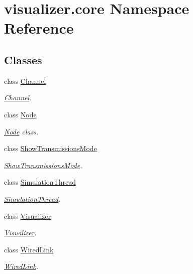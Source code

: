 \hypertarget{namespacevisualizer_1_1core}{}\section{visualizer.\+core Namespace Reference}
\label{namespacevisualizer_1_1core}
\subsection*{Classes}
\begin{DoxyCompactItemize}
\item 
class \hyperlink{classvisualizer_1_1core_1_1Channel}{Channel}
\begin{DoxyCompactList}\small\item\em \hyperlink{classvisualizer_1_1core_1_1Channel}{Channel}. \end{DoxyCompactList}\item 
class \hyperlink{classvisualizer_1_1core_1_1Node}{Node}
\begin{DoxyCompactList}\small\item\em \hyperlink{classvisualizer_1_1core_1_1Node}{Node} class. \end{DoxyCompactList}\item 
class \hyperlink{classvisualizer_1_1core_1_1ShowTransmissionsMode}{Show\+Transmissions\+Mode}
\begin{DoxyCompactList}\small\item\em \hyperlink{classvisualizer_1_1core_1_1ShowTransmissionsMode}{Show\+Transmissions\+Mode}. \end{DoxyCompactList}\item 
class \hyperlink{classvisualizer_1_1core_1_1SimulationThread}{Simulation\+Thread}
\begin{DoxyCompactList}\small\item\em \hyperlink{classvisualizer_1_1core_1_1SimulationThread}{Simulation\+Thread}. \end{DoxyCompactList}\item 
class \hyperlink{classvisualizer_1_1core_1_1Visualizer}{Visualizer}
\begin{DoxyCompactList}\small\item\em \hyperlink{classvisualizer_1_1core_1_1Visualizer}{Visualizer}. \end{DoxyCompactList}\item 
class \hyperlink{classvisualizer_1_1core_1_1WiredLink}{Wired\+Link}
\begin{DoxyCompactList}\small\item\em \hyperlink{classvisualizer_1_1core_1_1WiredLink}{Wired\+Link}. \end{DoxyCompactList}\end{DoxyCompactItemize}
